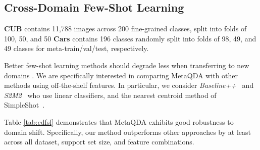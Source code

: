 \documentclass[10pt,twocolumn,letterpaper]{article}
\begin{document}
\subsection{Cross-Domain Few-Shot Learning}

\textbf{CUB} \cite{hilliard2018few} contains 11,788 images across 200 fine-grained classes, split into folds of 100, 50, and 50 \textbf{Cars} \cite{krause2013cars,tseng2020cross} contains 196 classes randomly split into folds of 98, 49, and 49 classes for meta-train/val/test, respectively.


Better few-shot learning methods should degrade less when transferring to new domains \cite{chen2019closerfewshot,tseng2020cross}. 
We are specifically interested in comparing MetaQDA with other methods using off-the-shelf features. In particular, we consider \textit{Baseline++}~\cite{chen2019closerfewshot} and
\textit{S2M2}~\cite{mangla2020charting} who use linear classifiers, and the nearest centroid method of SimpleShot~\cite{wang2019simpleshot}. 

Table \ref{tab:cdfsl} demonstrates that MetaQDA exhibits good robustness to domain shift. Specifically, our method outperforms other approaches by at least  across all dataset, support set size, and feature combinations.
\end{document}
